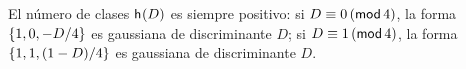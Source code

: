 \begin{obsRepresentaciones}\label{obs:representaciones:gaussianas}
	El n\'umero de clases $\nClases(D)$ es siempre positivo:
	si $D\equiv 0\tmodulo[4]$, la forma
	$\binaria{1,0,-D/4}$ es gaussiana de discriminante $D$;
	si $D\equiv 1\tmodulo[4]$, la forma
	$\binaria{1,1,(1-D)/4}$ es gaussiana de discriminante $D$.
\end{obsRepresentaciones}

% 

